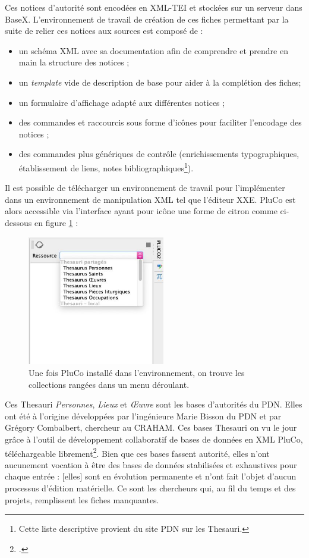 \documentclass[a4paper,12pt,twoside]{book}
\begin{document}
Ces notices d'autorité sont encodées en XML-TEI et stockées sur un serveur dans BaseX. L'environnement de travail de création de ces fiches permettant par la suite de relier ces notices aux sources est composé de :
\begin{itemize}
    \item un schéma XML avec sa documentation afin de comprendre et prendre en main la structure des notices ;
    \item un \textit{template} vide de description de base pour aider à la complétion des fiches;
    \item un formulaire d'affichage adapté aux différentes notices ;
    \item des commandes et raccourcis sous forme d'icônes pour faciliter l'encodage des notices ;
    \item des commandes plus génériques de contrôle (enrichissements typographiques, établissement de liens, notes bibliographiques\footnote{Cette liste descriptive provient du site \acrshort{PDN} sur les Thesauri.}).
\end{itemize}

Il est possible de télécharger un environnement de travail pour l'implémenter dans un environnement de manipulation XML tel que l'éditeur \acrshort{XXE}. PluCo est alors accessible via l'interface ayant pour icône une forme de citron comme ci-dessous en figure \ref{citron} :

\begin{figure}[H]
    \centering
    \includegraphics[width=6cm]{img/partie_3/pluco.JPG}
    \caption{Une fois PluCo installé dans l'environnement, on trouve les collections rangées dans un menu déroulant.}
    \label{citron}
\end{figure}


Ces Thesauri \textit{Personnes}, \textit{Lieux} et \textit{\OE{}uvre} sont les bases d'autorités du \acrshort{PDN}. Elles ont été à l'origine développées par l'ingénieure Marie Bisson du \acrshort{PDN} et par Grégory Combalbert, chercheur au \acrshort{CRAHAM}. Ces bases Thesauri on vu le jour grâce à l'outil de développement collaboratif de bases de données en XML \acrshort{PluCo}, téléchargeable librement\footcite{pluco}. Bien que ces bases fassent autorité, elles n'ont aucunement vocation à être des \og bases de données stabilisées et exhaustives pour chaque entrée : [elles] sont en évolution permanente et n'ont fait l'objet d'aucun processus d'édition matérielle\fg. Ce sont les chercheurs qui, au fil du temps et des projets, remplissent les fiches manquantes.
\end{document}
